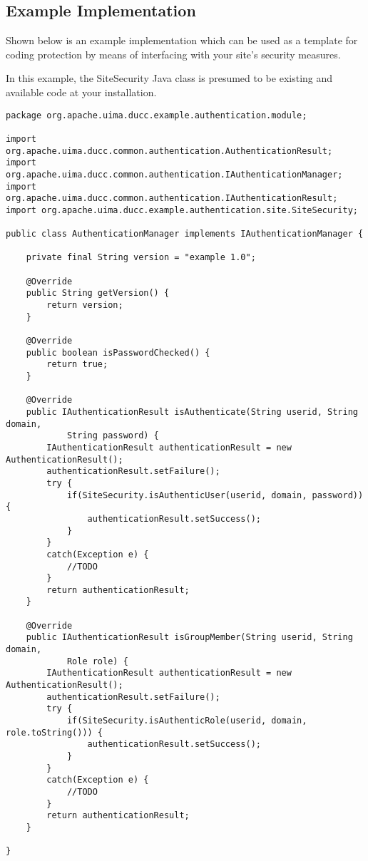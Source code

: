\subsection{Example Implementation}
    
    Shown below is an example implementation which can be used as a template
    for coding protection by means of interfacing with your site's security
    measures.
    
    In this example, the SiteSecurity Java class is presumed to be existing
    and available code at your installation.
    
    \begin{verbatim}
package org.apache.uima.ducc.example.authentication.module;

import org.apache.uima.ducc.common.authentication.AuthenticationResult;
import org.apache.uima.ducc.common.authentication.IAuthenticationManager;
import org.apache.uima.ducc.common.authentication.IAuthenticationResult;
import org.apache.uima.ducc.example.authentication.site.SiteSecurity;

public class AuthenticationManager implements IAuthenticationManager {

    private final String version = "example 1.0";
    
    @Override
    public String getVersion() {
        return version;
    }

    @Override
    public boolean isPasswordChecked() {
        return true;
    }

    @Override
    public IAuthenticationResult isAuthenticate(String userid, String domain,
            String password) {
        IAuthenticationResult authenticationResult = new AuthenticationResult();
        authenticationResult.setFailure();
        try {
            if(SiteSecurity.isAuthenticUser(userid, domain, password)) {
                authenticationResult.setSuccess();
            }
        }
        catch(Exception e) {
            //TODO
        }
        return authenticationResult;
    }

    @Override
    public IAuthenticationResult isGroupMember(String userid, String domain,
            Role role) {
        IAuthenticationResult authenticationResult = new AuthenticationResult();
        authenticationResult.setFailure();
        try {
            if(SiteSecurity.isAuthenticRole(userid, domain, role.toString())) {
                authenticationResult.setSuccess();
            }
        }
        catch(Exception e) {
            //TODO
        }
        return authenticationResult;
    }

}
    \end{verbatim}
        
